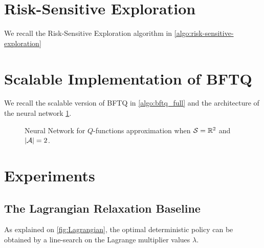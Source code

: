 
\section{Risk-Sensitive Exploration}

We recall the Risk-Sensitive Exploration algorithm in \cref{algo:risk-sensitive-exploration}




\section{Scalable Implementation of BFTQ}
\label{sec:bftq-full}

We recall the scalable version of BFTQ in \cref{algo:bftq_full} and the architecture of the neural network \cref{fig:architecture}.

\begin{figure}[tp]
    \centering
    
    \caption{Neural Network for $Q$-functions approximation when $\mathcal{S}=\mathbb{R}^2$ and $|\mathcal{A}| = 2$.}
    \label{fig:architecture}
\end{figure}



\section{Experiments}

\subsection{The Lagrangian Relaxation Baseline}

As explained on \cref{fig:Lagrangian}, the optimal deterministic policy can be obtained by a line-search on the Lagrange multiplier values $\lambda$.

